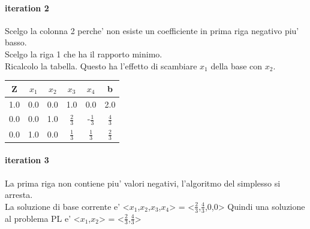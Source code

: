 \documentclass[a4paper,12pt,oneside]{article}
\begin{document}
    \paragraph{iteration 2}
    Scelgo la colonna 2 perche' non esiste un coefficiente in prima riga negativo piu' basso. \\
    Scelgo la riga 1 che ha il rapporto minimo. \\
    Ricalcolo la tabella.
    Questo ha l'effetto di scambiare $x_1$ della base con $x_2$. \
    \begin{center}
        \begin{tabular}{|c|c|c|c|c|c|}
            \hline
            Z & $x_1$ & $x_2$ & $x_3$ & $x_4$ & b\\
            \hline
            1.0 & 0.0 & 0.0 & 1.0 & 0.0 & 2.0\\
            0.0 & 0.0 & 1.0 & $\frac 2 3$ & -$\frac 1 3$ & $\frac 4 3$\\
            0.0 & 1.0 & 0.0 & $\frac 1 3$ & $\frac 1 3$ & $\frac 2 3$\\
            \hline
        \end{tabular}
    \end{center}
    \paragraph{iteration 3}
    La prima riga non contiene piu' valori negativi, l'algoritmo del simplesso si arresta. \\
    La soluzione di base corrente e' <$x_1$,$x_2$,$x_3$,$x_4$> = <$\frac 2 3$,$\frac 4 3$,0,0>\*
    Quindi una soluzione al problema PL e' <$x_1$,$x_2$> = <$\frac 2 3$,$\frac 4 3$>\*
\end{document}
